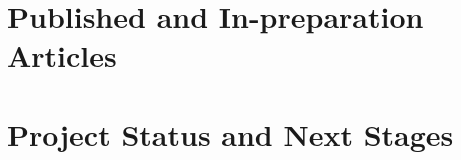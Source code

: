 \documentclass[11pt]{Latex/Classes/PhDthesisPSnPDF}
\begin{document}
\chapter{Published and In-preparation Articles}
\label{chapter:Publications}

			
\chapter{Project Status and Next Stages}
	\label{s:WorkPlan}
				



\renewcommand{\bibname}{References}
\setlength{}
\printbibliography
{}
\end{document}
